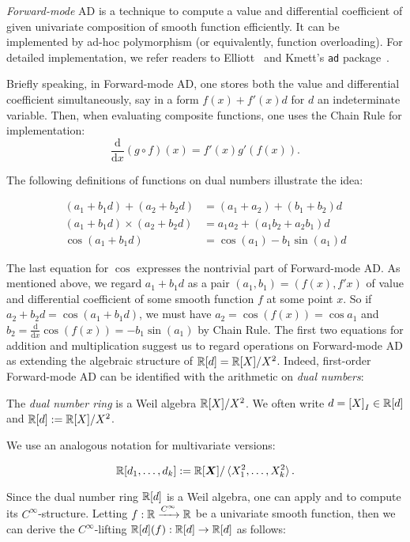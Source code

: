\emph{Forward-mode} AD is a technique to compute a value and differential coefficient of given univariate composition of smooth function efficiently.
It can be implemented by ad-hoc polymorphism (or equivalently, function overloading).
For detailed implementation, we refer readers to Elliott~\cite{Elliott2009-beautiful-differentiation} and Kmett's \texttt{ad} package~\cite{Kmett:2010aa}.

Briefly speaking, in Forward-mode AD, one stores both the value and differential coefficient simultaneously, say in a form $f(x) + f'(x) d$ for $d$ an indeterminate variable.
Then, when evaluating composite functions, one uses the Chain Rule for implementation:
\[
  \frac{\mathrm{d}}{\mathrm{d}x}(g \circ f)(x) = f'(x) g'(f(x)).
\]

The following definitions of functions on dual numbers illustrate the idea:

\begin{align*}
  (a_1 + b_1 d) + (a_2 + b_2 d) &= (a_1 + a_2) + (b_1 + b_2)d\\
  (a_1 + b_1 d) \times (a_2 + b_2 d) &= a_1 a_2 + (a_1 b_2 + a_2 b_1)d\\
  \cos(a_1 + b_1 d) &= \cos(a_1) - b_1 \sin(a_1) d
\end{align*}

The last equation for $\cos$ expresses the nontrivial part of Forward-mode AD.
As mentioned above, we regard $a_1 + b_1 d$ as a pair $(a_1, b_1) = (f(x), f'x)$ of value and differential coefficient of some smooth function $f$ at some point $x$.
So if $a_2 + b_2 d = \cos(a_1 + b_1 d)$, we must have $a_2 = \cos(f(x)) = \cos a_1$ and $b_2 = \frac{\mathrm d}{\mathrm{d} x} \cos(f(x)) = -b_1 \sin(a_1)$ by Chain Rule.
The first two equations for addition and multiplication suggest us to regard operations on Forward-mode AD as extending the algebraic structure of $\mathbb{R}[d] = \mathbb{R}[X]/X^2$.
Indeed, first-order Forward-mode AD can be identified with the arithmetic on \emph{dual numbers}:
\begin{definition}
  The \emph{dual number ring} is a Weil algebra $\mathbb{R}[X]/{X^2}$.
  We often write $d = {[X]}_I \in \mathbb{R}[d]$ and $\mathbb{R}[d] \mathrel{:=} \mathbb{R}[X]/{X^2}$.

  We use an analogous notation for multivariate versions:
  
  \[
    \mathbb{R}[d_1, \dots, d_k] \mathrel{:=} \mathbb{R}[\boldsymbol{X}]/\braket{X_1^2, \dots, X_k^2}.
  \]
\end{definition}

Since the dual number ring $\mathbb{R}[d]$ is a Weil algebra, one can apply  and  to compute its $C^\infty$-structure.
Letting $f: \mathbb{R} \xrightarrow{C^\infty} \mathbb{R}$ be a univariate smooth function, then we can derive the $C^\infty$-lifting $\mathbb{R}[d](f): \mathbb{R}[d] \to \mathbb{R}[d]$ as follows:

